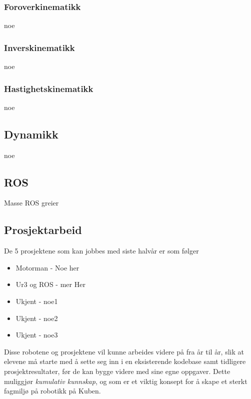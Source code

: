     \subsubsection{Foroverkinematikk}
        noe


    \subsubsection{Inverskinematikk}
        noe


    \subsubsection{Hastighetskinematikk}
        noe


\subsection{Dynamikk}
        noe



\subsection{ROS}
        Masse ROS greier

\subsection{Prosjektarbeid}

    De 5 prosjektene som kan jobbes med siste halvår er som følger
    \begin{itemize}
        \item Motorman - Noe her
        \item Ur3 og ROS - mer Her
        \item Ukjent - noe1
        \item Ukjent - noe2
        \item Ukjent - noe3
    \end{itemize}

    Disse robotene og prosjektene vil kunne arbeides videre på fra år til år, slik at elevene må starte med å sette seg inn i en eksisterende kodebase samt tidligere prosjektresultater, før de kan bygge videre med sine egne oppgaver. Dette muliggjør \emph{kumulativ kunnskap}, og som er et viktig konsept for å skape et sterkt fagmiljø på robotikk på Kuben.

